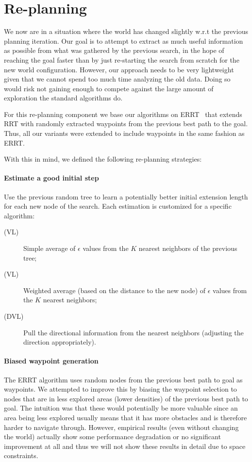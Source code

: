 \documentclass[10pt,twoside,twocolumn]{article}
\begin{document}
\section{Re-planning}

We now are in a situation where the world has changed slightly w.r.t
the previous planning iteration. 
Our goal is to attempt to extract as much useful information as
possible from what was gathered by the previous 
search, in the hope of reaching the goal faster than by just re-starting
the search from scratch for the new world configuration. 
However, our approach needs to be very lightweight given that we cannot spend 
too much time analyzing the old data. Doing so would risk not gaining enough to
compete against the large amount of exploration the standard algorithms do.

For this re-planning component we base our algorithms on
ERRT~\cite{Bruce02real-timerandomized} 
that extends RRT with randomly extracted waypoints from the previous
best path to the goal. Thus, all our variants were extended to include
waypoints in the same fashion as ERRT.

With this in mind, we defined the following re-planning strategies:
\paragraph{Estimate a good initial step} 
Use the previous random tree to
  learn a potentially better initial extension length for each new
  node of the search. 
  Each estimation is customized for a specific algorithm:
\begin{description}
\item[(VL)] Simple average of $\epsilon$ values from the $K$ nearest neighbors of the previous tree;
\item[(VL)] Weighted average (based on the distance to the new node) of $\epsilon$ values from the $K$ nearest neighbors; 
\item[(DVL)] Pull the directional information from the nearest neighbors (adjusting the direction appropriately).
\end{description}

\paragraph{Biased waypoint generation} 
The ERRT algorithm uses random
  nodes from the previous best path to goal as waypoints. 
  We attempted to improve this by biasing the waypoint selection to
  nodes that are in less explored areas (lower densities) of the previous best path to goal. 
  The intuition was that these would potentially be more valuable
  since an area being less explored usually means that it has more
  obstacles and is therefore harder to navigate through. 
  However, empirical results (even without changing the world) actually show
  some performance degradation or no significant improvement at all
  and thus we will not show these results in detail due to space constraints.
\end{document}
